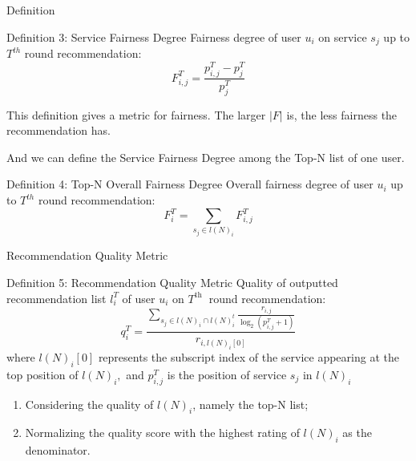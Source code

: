 \begin{frame}{Definition}%

\begin{block}{Definition 3: Service Fairness Degree}
  Fairness degree of user $u_{i}$ on service $s_{j}$ up to $T^{t h}$ round recommendation:
\begin{equation}
F_{i, j}^{T}=\frac{p_{i, j}^{T}-p_{j}^{T}}{p_{j}^{T}}
\label{eqn:def_fairness}
\end{equation}

\end{block}
This definition gives a metric for fairness. The larger $|F|$ is,
the less fairness the recommendation has.

And we can define the Service Fairness Degree among the Top-N list of one user.

\begin{block}{Definition 4: Top-N Overall Fairness Degree}
  Overall fairness degree of user $u_{i}$ up to $T^{t h}$ round recommendation:
\begin{equation}
F_{i}^{T}=\sum_{s_{j} \in l(N)_{i}} F_{i, j}^{T}
\end{equation}

\end{block}
\end{frame}


\begin{frame}{Recommendation Quality Metric}%

\begin{block}{Definition 5:  Recommendation Quality Metric}
 Quality of outputted recommendation list $l_{i}^{T}$ of user $u_{i}$ on $T^{\text {th }}$ round recommendation:
\begin{equation}
    q_{i}^{T}=\frac{\sum_{s_{j} \in l(N)_{i} \cap l(N)_{i}^{t}} \frac{r_{i, j}}{\log _{2}\left(p_{i, j}^{T}+1\right)}}{r_{i, l(N)_{i}[0]}}
\end{equation}
where $l(N)_{i}[0]$ represents the subscript index of the service appearing at the top position of $l(N)_{i},$ and $p_{i, j}^{T}$ is the position of service $s_{j}$ in $l(N)_{i}$
\end{block}

\begin{enumerate}
    \item Considering the quality of $l(N)_{i}$, namely the top-N list;
    \item Normalizing the quality score with the highest rating of $l(N)_{i}$ as the denominator.
\end{enumerate}

 

\end{frame}
